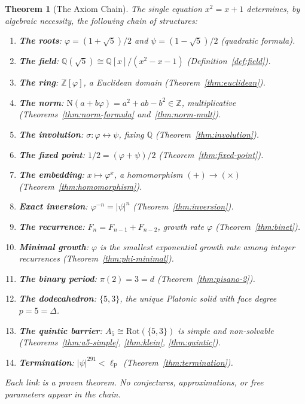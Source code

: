 \documentclass[11pt,a4paper]{article}
\theoremstyle{plain}
\newtheorem{theorem}{Theorem}[section]
\theoremstyle{definition}
\newcommand{\Z}{\mathbb{Z}}
\newcommand{\Q}{\mathbb{Q}}
\newcommand{\vp}{\varphi}
\newcommand{\ps}{\psi}
\newcommand{\Norm}{\mathrm{N}}
\begin{document}
\begin{theorem}[The Axiom Chain]\label{thm:chain}
The single equation $x^{2} = x + 1$ determines, by algebraic necessity,
the following chain of structures:
\begin{enumerate}
  \item \textbf{The roots}: $\vp = (1+\sqrt{5})/2$ and
    $\ps = (1-\sqrt{5})/2$ (quadratic formula).
  \item \textbf{The field}: $\Q(\sqrt{5}) \cong \Q[x]/(x^{2}-x-1)$
    (Definition~\ref{def:field}).
  \item \textbf{The ring}: $\Z[\vp]$, a Euclidean domain
    (Theorem~\ref{thm:euclidean}).
  \item \textbf{The norm}: $\Norm(a+b\vp) = a^{2}+ab-b^{2} \in \Z$,
    multiplicative (Theorems~\ref{thm:norm-formula}
    and~\ref{thm:norm-mult}).
  \item \textbf{The involution}: $\sigma : \vp \leftrightarrow \ps$,
    fixing $\Q$ (Theorem~\ref{thm:involution}).
  \item \textbf{The fixed point}: $1/2 = (\vp+\ps)/2$
    (Theorem~\ref{thm:fixed-point}).
  \item \textbf{The embedding}: $x \mapsto \vp^{x}$, a homomorphism
    $(+) \to (\times)$ (Theorem~\ref{thm:homomorphism}).
  \item \textbf{Exact inversion}: $\vp^{-n} = |\ps|^{n}$
    (Theorem~\ref{thm:inversion}).
  \item \textbf{The recurrence}: $F_{n} = F_{n-1} + F_{n-2}$, growth
    rate $\vp$ (Theorem~\ref{thm:binet}).
  \item \textbf{Minimal growth}: $\vp$ is the smallest exponential
    growth rate among integer recurrences
    (Theorem~\ref{thm:phi-minimal}).
  \item \textbf{The binary period}: $\pi(2) = 3 = d$
    (Theorem~\ref{thm:pisano-2}).
  \item \textbf{The dodecahedron}: $\{5,3\}$, the unique Platonic solid
    with face degree $p = 5 = \Delta$.
  \item \textbf{The quintic barrier}: $A_{5} \cong \mathrm{Rot}(\{5,3\})$
    is simple and non-solvable (Theorems~\ref{thm:a5-simple},
    \ref{thm:klein}, \ref{thm:quintic}).
  \item \textbf{Termination}: $|\ps|^{291} < \ell_{\mathrm{P}}$
    (Theorem~\ref{thm:termination}).
\end{enumerate}
Each link is a proven theorem.  No conjectures, approximations, or free
parameters appear in the chain.
\end{theorem}
\end{document}
